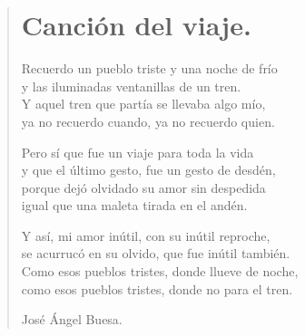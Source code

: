 \documentclass[11pt, portrait, twoside, notitlepage, openright]{book}
\begin{document}
\newpage
\begin{verse}
\begin{center}
\section{Canción del viaje.}
\end{center}
Recuerdo un pueblo triste y una noche de frío\\
y las iluminadas ventanillas de un tren.\\
Y aquel tren que partía se llevaba algo mío,\\
ya no recuerdo cuando, ya no recuerdo quien.
\newline

Pero sí que fue un viaje para toda la vida\\
y que el último gesto, fue un gesto de desdén,\\
porque dejó olvidado su amor sin despedida\\
igual que una maleta tirada en el andén.
\newline

Y así, mi amor inútil, con su inútil reproche,\\
se acurrucó en su olvido, que fue inútil también.\\
Como esos pueblos tristes, donde llueve de noche,\\
como esos pueblos tristes, donde no para el tren.
\newline

José Ángel Buesa.
\end{verse}
\end{document}
